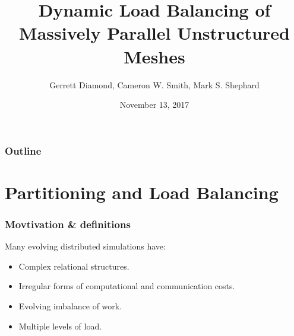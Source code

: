 \documentclass{beamer}
\begin{document}
\title[Unstructured Mesh Workflows]
{
Dynamic Load Balancing of Massively Parallel Unstructured Meshes
}
\author{Gerrett Diamond, Cameron W. Smith, Mark S. Shephard}


\date{November 13, 2017}

\begin{frame}[plain]
  \titlepage
\end{frame}

\begin{frame}
  \frametitle{Outline}
  \tableofcontents
\end{frame}

\section{Partitioning and Load Balancing}
\begin{frame}
  \frametitle{Movtivation \& definitions}
  Many evolving distributed simulations have: \\
  \begin{itemize}
    \item Complex relational structures.
    \item Irregular forms of computational and communication costs.
    \item Evolving imbalance of work. %
    \item Multiple levels of load.
  \end{itemize}
\end{frame}
\end{document}

